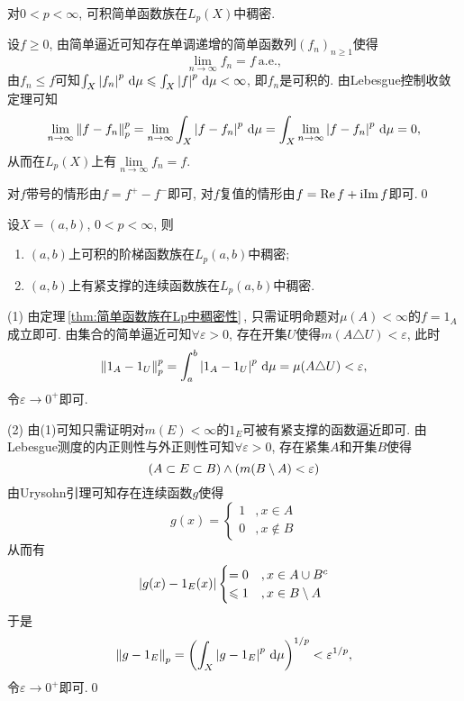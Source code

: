 	\begin{Theorem}\label{thm:简单函数族在Lp中稠密性}
	对$ 0<p<\infty $, 可积简单函数族在$ L_p(X) $中稠密.
	\end{Theorem}
	\begin{Proof}
	设$ f\geqslant 0 $, 由简单逼近可知存在单调递增的简单函数列$ (f_n)_{n\geqslant 1} $使得
	\[
	\lim_{n\to\infty}f_n=f\ \text{a.e.},
	\]
	由$ f_n\leqslant f $可知$ \int_X\left| f_n \right| ^p\,\mathrm{d}\mu\leqslant\int_X\left| f \right| ^p\,\mathrm{d}\mu<\infty $, 即$ f_n $是可积的. 由Lebesgue控制收敛定理可知
	\[
	\lim_{n\to\infty}\left\| f-f_n \right\|_p^p=\lim_{n\to\infty}\int_X\left| f-f_n \right| ^p\,\mathrm{d}\mu=\int_X\lim_{n\to\infty}\left| f-f_n \right| ^p\,\mathrm{d}\mu=0,
	\]
	从而在$ L_p(X) $上有$ \lim\limits_{n\to\infty}f_n=f $.

	对$ f $带号的情形由$ f=f^+-f^- $即可, 对$ f $复值的情形由$ f=\mathrm{Re\,} f+\mathrm{i}\mathrm{Im\,} f $即可.\qed
	\end{Proof}

	\begin{Corollary}
	设$ X=(a,b) $, $ 0<p<\infty $, 则
	\begin{enumerate}[(1)]
	\item $ (a,b) $上可积的阶梯函数族在$ L_p(a,b) $中稠密;
	\item $ (a,b) $上有紧支撑的连续函数族在$ L_p(a,b) $中稠密.
	\end{enumerate}
	\end{Corollary}
	\begin{Proof}
	(1) 由定理\,\ref{thm:简单函数族在Lp中稠密性}\,, 只需证明命题对$ \mu(A)<\infty $的$ f=1_A $成立即可. 由集合的简单逼近可知$ \forall\varepsilon>0 $, 存在开集$ U $使得$ m(A\triangle U)<\varepsilon $, 此时
	\[
	\left\| 1_A-1_U \right\|_p^p=\int_a^b\left| 1_A-1_U \right| ^p\,\mathrm{d}\mu=\mu(A\triangle U)<\varepsilon,
	\]
	令$ \varepsilon\to 0^+ $即可.

	(2) 由(1)可知只需证明对$ m(E)<\infty $的$ 1_E $可被有紧支撑的函数逼近即可. 由Lebesgue测度的内正则性与外正则性可知$ \forall\varepsilon>0 $, 存在紧集$ A $和开集$ B $使得
	\[
	(A\subset E\subset B)\land(m(B\setminus A)<\varepsilon)
	\]
	由Urysohn引理可知存在连续函数$ g $使得
	\[
	g(x)=\begin{cases}
	1 & ,x\in A\\0 & ,x\notin B
	\end{cases}
	\]
	从而有
	\[
	\left| g(x)-1_E(x) \right| \begin{cases}
	=0 & ,x\in A\cup B^c\\\leqslant 1 & ,x\in B\setminus A
	\end{cases}
	\]
	于是
	\[
	\left\| g-1_E \right\|_p=\left(\int_X\left| g-1_E \right| ^p\,\mathrm{d}\mu\right)^{1/p}<\varepsilon^{1/p},
	\]
	令$ \varepsilon\to 0^+ $即可.\qed
	\end{Proof}

